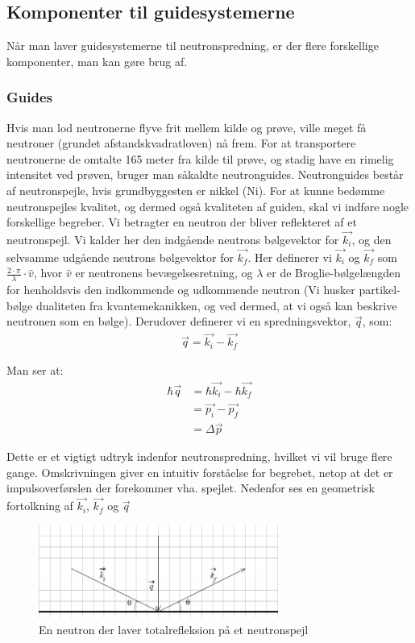 \documentclass[12pt,oneside,a4paper]{article}
\begin{document}
{{{{{\subsection{Komponenter til guidesystemerne}
Når man laver guidesystemerne til neutronspredning, er der flere forskellige komponenter, man kan gøre brug af.

\subsubsection{Guides}

Hvis man lod neutronerne flyve frit mellem kilde og prøve, ville meget få neutroner (grundet afstandskvadratloven) nå frem. For at transportere neutronerne de omtalte 165 meter fra kilde til prøve, og stadig have en rimelig intensitet ved prøven, bruger man såkaldte neutronguides. Neutronguides består af neutronspejle, hvis grundbyggesten er nikkel (Ni).
For at kunne bedømme neutronspejles kvalitet, og dermed også kvaliteten af guiden, skal vi indføre nogle forskellige begreber. Vi betragter en neutron der bliver reflekteret af et neutronspejl. Vi kalder her den indgående neutrons bølgevektor for $\vec{k_i}$, og den selvsamme udgående neutrons bølgevektor for  $\vec{k_f}$. Her definerer vi $\vec{k_i}$ og $\vec{k_f}$ som  $ {\frac{2 \cdot \pi}{\lambda}} \cdot \hat{v}$, hvor $\hat{v}$ er neutronens bevægelsesretning, og $\lambda$ er de Broglie-bølgelængden for henholdsvis den indkommende og udkommende neutron (Vi husker partikel-bølge dualiteten fra kvantemekanikken, og ved dermed, at vi også kan beskrive neutronen som en bølge). Derudover definerer vi en spredningsvektor, $\vec{q}$, som:
\begin{align}
\vec{q}=\vec{k_i}-\vec{k_f}
\end{align}

Man ser at:
\begin{align}
\hbar \vec{q} & = \hbar \vec{k_i} - \hbar \vec{k_f} \\ 
          & = \vec{p_i} - \vec{p_f} \\ 
          & = \Delta \vec{p}
\end{align}

Dette er et vigtigt udtryk indenfor neutronspredning, hvilket vi vil bruge flere gange. Omskrivningen giver en intuitiv forståelse for begrebet, netop at det er impulsoverførslen der forekommer vha. spejlet. Nedenfor ses en geometrisk fortolkning af $\vec{k_i}$, $\vec{k_f}$  og $ \vec{q}$

\begin{figure}[H]
\centering
\includegraphics[width=0.7\textwidth]{billede3.png}
\caption{En neutron der laver totalrefleksion på et neutronspejl}
\end{figure}

}}}}}
\end{document}
